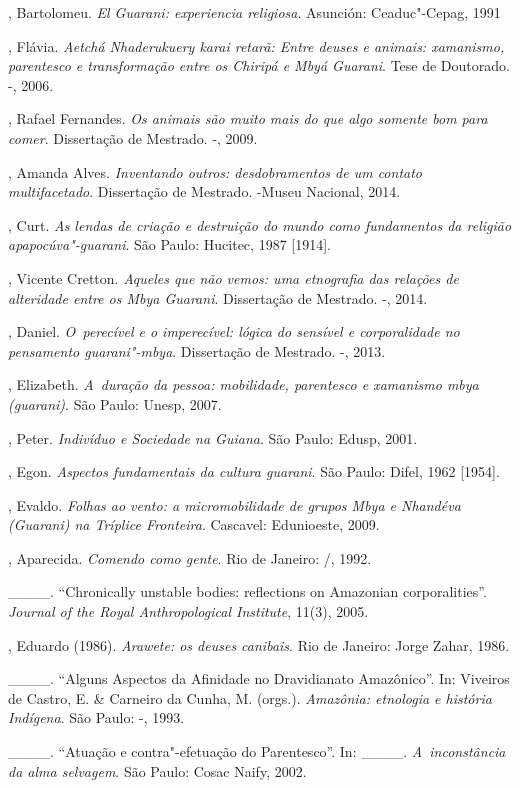 \begin{Parskip}
, Bartolomeu. \emph{El Guarani: experiencia religiosa}. Asunción:
Ceaduc"-Cepag, 1991

, Flávia. \emph{Aetchá Nhaderukuery karai retarã: Entre
deuses e animais: xamanismo, parentesco e transformação entre os
Chiripá e Mbyá Guarani}. Tese de Doutorado. -,
2006.

 , Rafael Fernandes. \emph{Os animais são muito mais do que algo
somente bom para comer}. Dissertação de Mestrado. -,
2009.

, Amanda Alves. \emph{Inventando outros: desdobramentos de um contato
multifacetado}. Dissertação de Mestrado. -Museu
Nacional, 2014.

, Curt. \emph{As lendas de criação e destruição do mundo como
fundamentos da religião apapocúva"-guarani}. São Paulo: Hucitec, 1987
[1914].

, Vicente Cretton. \emph{Aqueles que não vemos: uma etnografia das
relações de alteridade entre os Mbya Guarani}. Dissertação de Mestrado.
-, 2014.

, Daniel. \emph{O~perecível e o imperecível: lógica do sensível
e corporalidade no pensamento guarani"-mbya}. Dissertação de Mestrado.
-, 2013.

, Elizabeth. \emph{A~duração da pessoa: mobilidade, parentesco e
xamanismo mbya (guarani)}. São Paulo: Unesp, 2007.

, Peter. \emph{Indivíduo e Sociedade na Guiana}. São Paulo: Edusp, 2001.

, Egon. \emph{Aspectos fundamentais da cultura guarani}. São Paulo:
Difel, 1962 [1954]. 

, Evaldo. \emph{Folhas ao vento: a micromobilidade de grupos
Mbya e Nhandéva (Guarani) na Tríplice Fronteira}. Cascavel: Edunioeste,
2009.

, Aparecida. \emph{Comendo como gente}. Rio de Janeiro: /,
1992.

\_\_\_\_. ``Chronically unstable bodies: reflections on Amazonian
corporalities''. \emph{Journal of the Royal Anthropological Institute}, 11(3),
2005.

, Eduardo (1986). \emph{Arawete: os deuses canibais}. Rio de
Janeiro: Jorge Zahar, 1986.

\_\_\_\_. ``Alguns Aspectos da Afinidade no Dravidianato Amazônico''. In:
Viveiros de Castro, E. \& Carneiro da Cunha, M. (orgs.).
\emph{Amazônia: etnologia e história Indígena}. São Paulo: -,
1993.

\_\_\_\_. ``Atuação e contra"-efetuação do Parentesco''. In: \_\_\_\_. \emph{A~inconstância da
alma selvagem}. São Paulo: Cosac Naify, 2002.
\end{Parskip}

